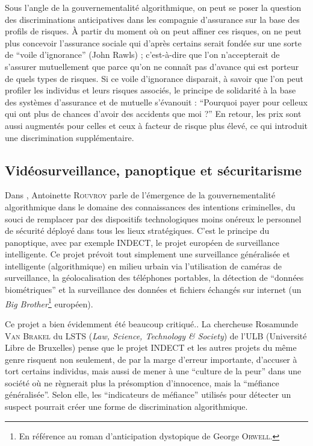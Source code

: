 \documentclass[a4paper,12pt]{report}
\begin{document}
Sous l'angle de la gouvernementalité algorithmique, on peut se poser la question des discriminations anticipatives dans les compagnie d'assurance sur la base des profils de risques. À partir du moment où on peut affiner ces risques, on ne peut plus concevoir l'assurance sociale qui d'après certains serait fondée sur une sorte de ``voile d'ignorance'' (John Rawls) ; c'est-à-dire que l'on n'accepterait de s'assurer mutuellement que parce qu'on ne connaît pas d'avance qui est porteur de quels types de risques. Si ce voile d'ignorance disparait, à savoir que l'on peut profiler les individus et leurs risques associés, le principe de solidarité à la base des systèmes d'assurance et de mutuelle s'évanouit : ``Pourquoi payer pour celleux qui ont plus de chances d'avoir des accidents que moi ?'' En retour, les prix sont aussi augmentés pour celles et ceux à facteur de risque plus élevé, ce qui introduit une discrimination supplémentaire.

\subsection{Vidéosurveillance, panoptique et sécuritarisme}

Dans \cite{nps}, Antoinette \textsc{Rouvroy} parle de l'émergence de la gouvernementalité algorithmique dans le domaine des connaissances des intentions criminelles, du souci de remplacer par des dispositifs technologiques moins onéreux le personnel de sécurité déployé dans tous les lieux stratégiques. C'est le principe du panoptique, avec par exemple INDECT, le projet européen de surveillance intelligente. Ce projet prévoit tout simplement une surveillance généralisée et intelligente (algorithmique) en milieu urbain via l'utilisation de caméras de surveillance, la géolocalisation des téléphones portables, la détection de ``données biométriques'' et la surveillance des données et fichiers échangés sur internet (un \textit{Big Brother}\footnote{En référence au roman d'anticipation dystopique de George \textsc{Orwell}.} européen).

Ce projet a bien évidemment été beaucoup critiqué.. La chercheuse Rosamunde \textsc{Van Brakel} du LSTS (\textit{Law, Science, Technology \& Society}) de l'ULB (Université Libre de Bruxelles) pense que le projet INDECT et les autres projets du même genre risquent non seulement, de par la marge d'erreur importante, d'accuser à tort certains individus, mais aussi de mener à une ``culture de la peur'' dans une société où ne règnerait plus la présomption d'innocence, mais la ``méfiance généralisée''. Selon elle, les ``indicateurs de méfiance'' utilisés pour détecter un suspect pourrait créer une forme de discrimination algorithmique. 
\end{document}
